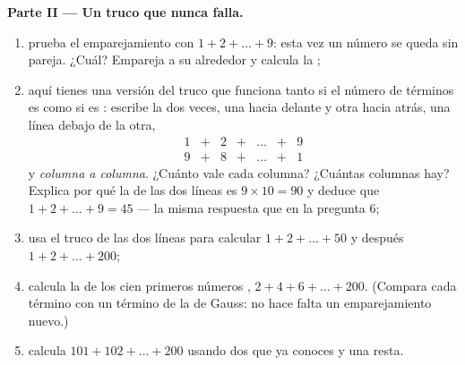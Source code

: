\begin{problem}
\medskip
\noindent\textbf{Parte II --- Un truco que nunca falla.}
\begin{enumerate}[resume]
  \item prueba el emparejamiento con $1 + 2 + \dots + 9$: esta vez un
        número se queda sin pareja. ¿Cuál? Empareja a su alrededor
        y calcula la ;
  \item aquí tienes una versión del truco que funciona tanto si el número de
        términos es  como si es : escribe la  dos veces, una
        hacia delante y otra hacia atrás, una línea debajo de la otra,
        \[
        \begin{array}{ccccccc}
        1 & + & 2 & + & \dots & + & 9 \\
        9 & + & 8 & + & \dots & + & 1
        \end{array}
        \]
        y  \emph{columna a columna}. ¿Cuánto vale cada columna?
        ¿Cuántas columnas hay? Explica por qué la  de
        las dos líneas es $9 \times 10 = 90$ y deduce que
        $1 + 2 + \dots + 9 = 45$ --- la misma respuesta que en la
        pregunta 6;
  \item usa el truco de las dos líneas para calcular $1 + 2 + \dots + 50$
        y después $1 + 2 + \dots + 200$;
  \item calcula la  de los cien primeros números \emph{},
        $2 + 4 + 6 + \dots + 200$. (Compara cada término con un término
        de la  de Gauss: no hace falta un emparejamiento nuevo.)
  \item calcula $101 + 102 + \dots + 200$ usando dos  que
        ya conoces y una resta.
\end{enumerate}


\end{problem}
